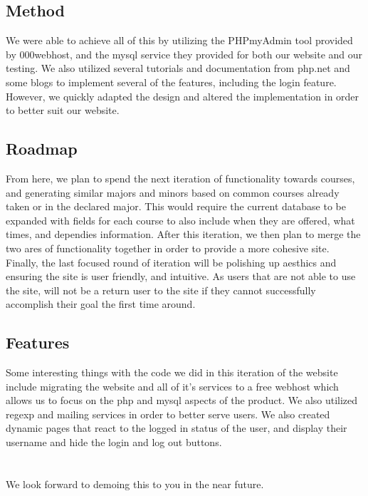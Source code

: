 \documentclass{article}
\begin{document}
\begin{doublespace}
\subsection*{Method}
\indent We were able to achieve all of this by utilizing the PHPmyAdmin tool provided by 000webhost, and the mysql service they provided for both our website and our testing. We also utilized several tutorials and documentation from php.net and some blogs to implement several of the features, including the login feature. However, we quickly adapted the design and altered the implementation in order to better suit our website.

\subsection*{Roadmap}
\indent From here, we plan to spend the next iteration of functionality towards courses, and generating similar majors and minors based on common courses already taken or in the declared major. This would require the current database to be expanded with fields for each course to also include when they are offered, what times, and dependies information. After this iteration, we then plan to merge the two ares of functionality together in order to provide a more cohesive site. Finally, the last focused round of iteration will be polishing up aesthics and ensuring the site is user friendly, and intuitive. As users that are not able to use the site, will not be a return user to the site if they cannot successfully accomplish their goal the first time around.

\subsection*{Features}
\indent Some interesting things with the code we did in this iteration of the website include migrating the website and all of it's services to a free webhost which allows us to focus on the php and mysql aspects of the product. We also utilized regexp and mailing services in order to better serve users. We also created dynamic pages that react to the logged in status of the user, and display their username and hide the login and log out buttons.
\\
\\
\\
We look forward to demoing this to you in the near future.


\end{doublespace}
\end{document}
